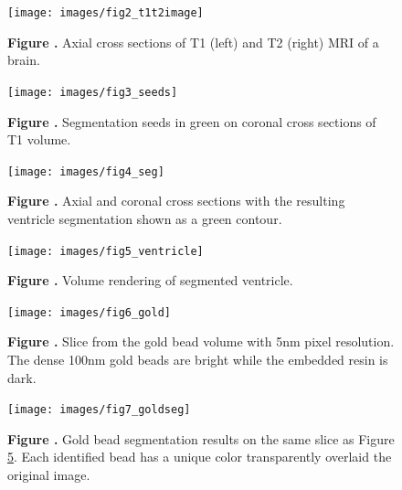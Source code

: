 \documentclass{frontiersMED} %
\begin{document}
\begin{figure}
\begin{center}
\texttt{[image: images/fig2\_t1t2image]}
\end{center}
 \textbf{\label{fig:02} Figure .}{ Axial cross sections of T1 (left) and T2 (right) MRI of a brain. }
\end{figure}

\begin{figure}
\begin{center}
\texttt{[image: images/fig3\_seeds]}
\end{center}
 \textbf{\label{fig:03} Figure
   .}{ Segmentation seeds in green on coronal cross sections of T1 volume. }
\end{figure}

\begin{figure}
\begin{center}
\texttt{[image: images/fig4\_seg]}
\end{center}
 \textbf{\label{fig:04} Figure
   .}{ Axial and coronal cross sections with the
   resulting ventricle segmentation shown as a green contour. }
\end{figure}


\begin{figure}
\begin{center}
\texttt{[image: images/fig5\_ventricle]}
\end{center}
 \textbf{\label{fig:05} Figure
   .}{ Volume rendering of segmented ventricle. }
\end{figure}

\begin{figure}
\begin{center}
\texttt{[image: images/fig6\_gold]}
\end{center}
 \textbf{\label{fig:06} Figure
   .}{ Slice from the gold bead volume with 5nm pixel resolution. The dense 100nm gold beads are bright while the embedded resin is dark.  }
\end{figure}

\begin{figure}
\begin{center}
\texttt{[image: images/fig7\_goldseg]}
\end{center}
 \textbf{\label{fig:07} Figure
   .}{ Gold bead segmentation results on the same slice
   as Figure \ref{fig:06}. Each identified bead has a
   unique color transparently overlaid the original image. }
\end{figure}
\end{document}
